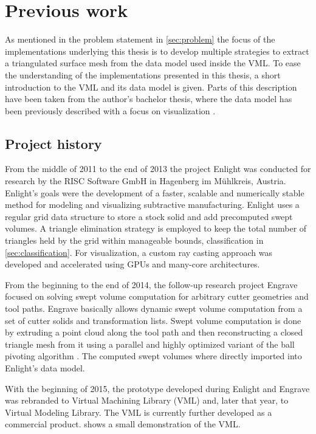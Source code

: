 \chapter{Previous work}
\label{ch:previous_work}

As mentioned in the problem statement in \cref{sec:problem} the focus of the implementations underlying this thesis is to develop multiple strategies to extract a triangulated surface mesh from the data model used inside the VML.
To ease the understanding of the implementations presented in this thesis, a short introduction to the VML and its data model is given.
Parts of this description have been taken from the author's bachelor thesis, where the data model has been previously described with a focus on visualization \cite{bachelor}.

\section{Project history}
\label{sec:project_history}

From the middle of 2011 to the end of 2013 the project Enlight was conducted for research by the RISC Software GmbH in Hagenberg im Mühlkreis, Austria.
Enlight's goals were the development of a faster, scalable and numerically stable method for modeling and visualizing subtractive manufacturing.
Enlight uses a regular grid data structure to store a stock solid and add precomputed swept volumes.
A triangle elimination strategy is employed to keep the total number of triangles held by the grid within manageable bounds, \cf classification in \cref{sec:classification}.
For visualization, a custom ray casting approach was developed \cite{enlight} and accelerated using GPUs and many-core architectures.

From the beginning to the end of 2014, the follow-up research project Engrave focused on solving swept volume computation for arbitrary cutter geometries and tool paths.
Engrave basically allows dynamic swept volume computation from a set of cutter solids and transformation lists.
Swept volume computation is done by extruding a point cloud along the tool path and then reconstructing a closed triangle mesh from it using a parallel and highly optimized variant of the ball pivoting algorithm \cite{engrave}.
The computed swept volumes where directly imported into Enlight's data model.

With the beginning of 2015, the prototype developed during Enlight and Engrave was rebranded to Virtual Machining Library (VML) and, later that year, to Virtual Modeling Library.
The VML is currently further developed as a commercial product.
 shows a small demonstration of the VML.

